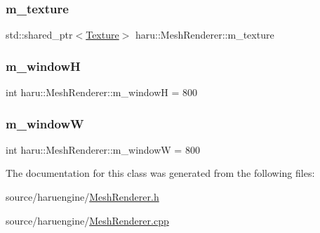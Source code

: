 \subsubsection{\texorpdfstring{m\+\_\+texture}{m\_texture}}
{\footnotesize\ttfamily std\+::shared\+\_\+ptr$<$\mbox{\hyperlink{classharu_1_1_texture}{Texture}}$>$ haru\+::\+Mesh\+Renderer\+::m\+\_\+texture\hspace{0.3cm}{\ttfamily [private]}}

\mbox{\label{classharu_1_1_mesh_renderer_a17e10695dd67e9094bd28c110231082c}} 
\subsubsection{\texorpdfstring{m\+\_\+windowH}{m\_windowH}}
{\footnotesize\ttfamily int haru\+::\+Mesh\+Renderer\+::m\+\_\+windowH = 800}

\mbox{\label{classharu_1_1_mesh_renderer_a30ea5ddf109ff42564c5eecfb73d4b4f}} 
\subsubsection{\texorpdfstring{m\+\_\+windowW}{m\_windowW}}
{\footnotesize\ttfamily int haru\+::\+Mesh\+Renderer\+::m\+\_\+windowW = 800}



The documentation for this class was generated from the following files\+:\begin{DoxyCompactItemize}
\item 
source/haruengine/\mbox{\hyperlink{_mesh_renderer_8h}{Mesh\+Renderer.\+h}}\item 
source/haruengine/\mbox{\hyperlink{_mesh_renderer_8cpp}{Mesh\+Renderer.\+cpp}}\end{DoxyCompactItemize}
